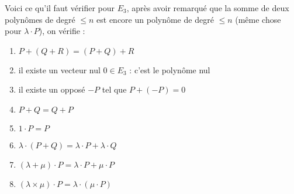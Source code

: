 \documentclass[11pt,a4paper]{article}
\renewcommand{\le}{\leqslant} \renewcommand{\leq}{\leqslant}
\begin{document}
\bigskip

Voici ce qu'il faut vérifier pour $E_3$, après avoir remarqué que la somme de deux polynômes de degré 
$\le n$ est encore un polynôme de degré $\le n$
(même chose pour $\lambda\cdot P$), on vérifie :

\begin{enumerate}
  \item $P+(Q+R)=(P+Q)+R$ 
  \item il existe un vecteur nul $0 \in E_3$ : c'est le polynôme nul
  \item il existe un opposé $-P$ tel que $P+(-P)=0$ 
  \item $P+Q=Q+P$ 
  \item $1\cdot P = P$ 
  \item $\lambda \cdot (P+Q) = \lambda\cdot P + \lambda \cdot Q$ 
  \item $(\lambda+\mu) \cdot P = \lambda\cdot P+ \mu \cdot P$ 
  \item $(\lambda\times\mu) \cdot P = \lambda\cdot (\mu\cdot P)$ 
\end{enumerate}
\end{document}
